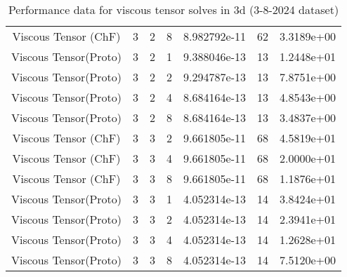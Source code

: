 \documentclass{article}
\begin{document}
\begin{small}
\begin{table}
\begin{center}
\begin{tabular}{|c|c|c|c|c|c||c|}
        Viscous Tensor  (ChF) & 3 & 2 & 8& 8.982792e-11 & 62 & 3.3189e+00\\
        Viscous Tensor(Proto) & 3 & 2 & 1& 9.388046e-13 & 13 & 1.2448e+01\\
        Viscous Tensor(Proto) & 3 & 2 & 2& 9.294787e-13 & 13 & 7.8751e+00\\
        Viscous Tensor(Proto) & 3 & 2 & 4& 8.684164e-13 & 13 & 4.8543e+00\\
        Viscous Tensor(Proto) & 3 & 2 & 8& 8.684164e-13 & 13 & 3.4837e+00\\
        \hline 
        Viscous Tensor  (ChF) & 3 & 3 & 2& 9.661805e-11 & 68 & 4.5819e+01\\
        Viscous Tensor  (ChF) & 3 & 3 & 4& 9.661805e-11 & 68 & 2.0000e+01\\
        Viscous Tensor  (ChF) & 3 & 3 & 8& 9.661805e-11 & 68 & 1.1876e+01\\
        Viscous Tensor(Proto) & 3 & 3 & 1& 4.052314e-13 & 14 & 3.8424e+01\\
        Viscous Tensor(Proto) & 3 & 3 & 2& 4.052314e-13 & 14 & 2.3941e+01\\
        Viscous Tensor(Proto) & 3 & 3 & 4& 4.052314e-13 & 14 & 1.2628e+01\\
        Viscous Tensor(Proto) & 3 & 3 & 8& 4.052314e-13 & 14 & 7.5120e+00\\
        \hline 
      \end{tabular} 
    \end{center}   
    \label{tab::datareductiontable3102024.vt_3} 
    \caption{Performance data for  viscous tensor solves in 3d (3-8-2024 dataset)}
  \end{table} 
\end{small}
\end{document}

